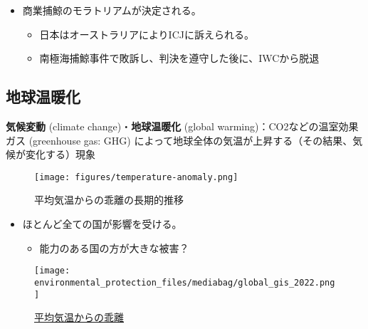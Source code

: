 \documentclass[
  xelatex,
  ja=standard]{bxjsarticle}
\providecommand{\tightlist}{%
  \setlength{\itemsep}{0pt}\setlength{\parskip}{0pt}}\usepackage{longtable,booktabs,array}
\begin{document}
\begin{itemize}
\tightlist
\item
  商業捕鯨のモラトリアムが決定される。

  \begin{itemize}
  \tightlist
  \item
    日本はオーストラリアによりICJに訴えられる。
  \item
    南極海捕鯨事件で敗訴し、判決を遵守した後に、IWCから脱退
  \end{itemize}
\end{itemize}

\hypertarget{ux5730ux7403ux6e29ux6696ux5316}{%
\subsection{地球温暖化}\label{ux5730ux7403ux6e29ux6696ux5316}}

\textbf{気候変動} (climate change)・\textbf{地球温暖化} (global
warming)：CO2などの温室効果ガス (greenhouse gas: GHG)
によって地球全体の気温が上昇する（その結果、気候が変化する）現象

\begin{figure}[htpb]

{\centering \texttt{[image: figures/temperature-anomaly.png]}

}

\caption{平均気温からの乖離の長期的推移}

\end{figure}

\begin{itemize}
\tightlist
\item
  ほとんど全ての国が影響を受ける。

  \begin{itemize}
  \tightlist
  \item
    能力のある国の方が大きな被害？
  \end{itemize}
\end{itemize}

\begin{figure}[htpb]

{\centering \texttt{[image: environmental\_protection\_files/mediabag/global\_gis\_2022.png]}

}

\caption{\href{https://earthobservatory.nasa.gov/world-of-change/global-temperatures}{平均気温からの乖離}}

\end{figure}
\end{document}
